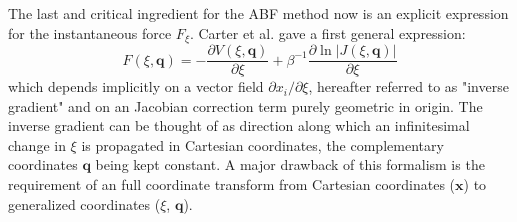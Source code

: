 The last and critical ingredient for the ABF method now is an explicit expression for the instantaneous force $F_{\xi}$. Carter et al.\autocite{carter1989constrained} gave a first general expression:
\begin{equation}
  F(\xi,\textbf{q}) = -\frac{\partial V(\xi,\textbf{q})}{\partial \xi} + \beta^{-1} \frac{\partial \ln|J(\xi,\textbf{q})|}{\partial\xi} \label{eq:instforce old}
\end{equation}
which depends implicitly on a vector field $\partial x_i / \partial \xi$, hereafter referred to as "inverse gradient" and on an Jacobian correction term purely geometric in origin. The inverse gradient can be thought of as direction along which an infinitesimal change in $\xi$ is propagated in Cartesian coordinates, the complementary coordinates $\textbf{q}$ being kept constant. A major drawback of this formalism is the requirement of an full coordinate transform from Cartesian coordinates ($\textbf{x}$) to generalized coordinates ($\xi$, $\textbf{q}$).

